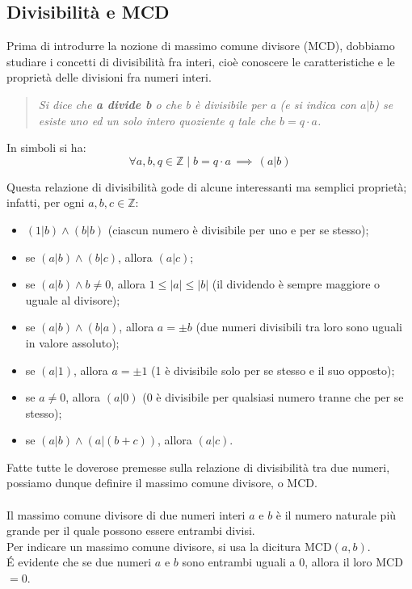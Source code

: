 \subsection{Divisibilità e MCD}
Prima di introdurre la nozione di massimo comune divisore (MCD), dobbiamo studiare i concetti di divisibilità fra interi, cioè conoscere le caratteristiche e le proprietà delle divisioni fra numeri interi.
\begin{quote}\label{divisioneIntera}
\emph{Si dice che \textbf{a divide b} o che b è divisibile per a (e si indica con $a|b$) se esiste uno ed un solo intero quoziente q tale che $b=q \cdot a$.}
\end{quote}
In simboli si ha:
\begin{equation}\label{divisibilita}
\forall a,b,q \in \mathbb{Z} \mid b=q \cdot a \, \implies \, (a|b)
\end{equation}

Questa relazione di divisibilità gode di alcune interessanti ma semplici proprietà; infatti, per ogni $a,b,c \in \mathbb{Z}$:
\begin{itemize}\label{proprietaDiv}
\item $(1|b) \land (b|b)$ (ciascun numero è divisibile per uno e per se stesso);
\item se $(a|b) \land (b|c)$, allora $(a|c)$;
\item se $(a|b) \land b\neq 0$, allora $1 \leq |a| \leq |b|$ (il dividendo è sempre maggiore o uguale al divisore);
\item se $(a|b) \land (b|a)$, allora $a = \pm b$ (due numeri divisibili tra loro sono uguali in valore assoluto);
\item se $(a|1)$, allora $a = \pm 1$ (1 è divisibile solo per se stesso e il suo opposto);
\item se $a \neq 0$, allora $(a|0)$ (0 è divisibile per qualsiasi numero tranne che per se stesso);
\item se $(a|b) \land (a|(b+c))$, allora $(a|c)$.
\end{itemize}

Fatte tutte le doverose premesse sulla relazione di divisibilità tra due numeri, possiamo dunque definire il massimo comune divisore, o MCD.\\\\
Il massimo comune divisore di due numeri interi $a$ e $b$ è il numero naturale più grande per il quale possono essere entrambi divisi.\\
Per indicare un massimo comune divisore, si usa la dicitura MCD$(a,b)$.\\
\'E evidente che se due numeri $a$ e $b$ sono entrambi uguali a $0$, allora il loro MCD $=0$.
